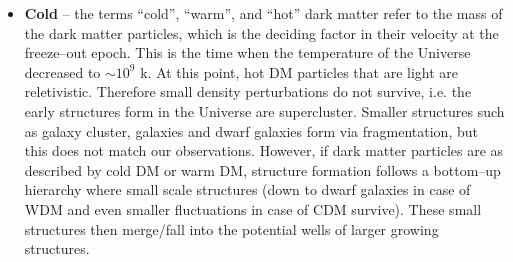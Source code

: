 \documentclass[paper=a4, fontsize=11pt]{scrartcl} %
\numberwithin{equation}{section} %
\numberwithin{figure}{section} %
\numberwithin{table}{section} %
\begin{document}
\begin{itemize}
  \item {\bf Cold} -- the terms ``cold'', ``warm'', and ``hot'' dark matter refer to the mass of the dark matter particles, which is the deciding factor in their velocity at the freeze--out epoch. This is the time when the temperature of the Universe decreased to $\sim 10^9$ k. At this point, hot DM particles that are light are reletivistic. Therefore small density perturbations do not survive, i.e. the early structures form in the Universe are supercluster. Smaller structures such as galaxy cluster, galaxies and dwarf galaxies form via fragmentation, but this does not match our observations. However, if dark matter particles are as described by cold DM or warm DM, structure formation follows a bottom--up hierarchy where small scale structures (down to dwarf galaxies in case of WDM and even smaller fluctuations in case of CDM survive). These small structures then merge/fall into the potential wells of larger growing structures. 
  
  
  \end{itemize}
\end{document}
